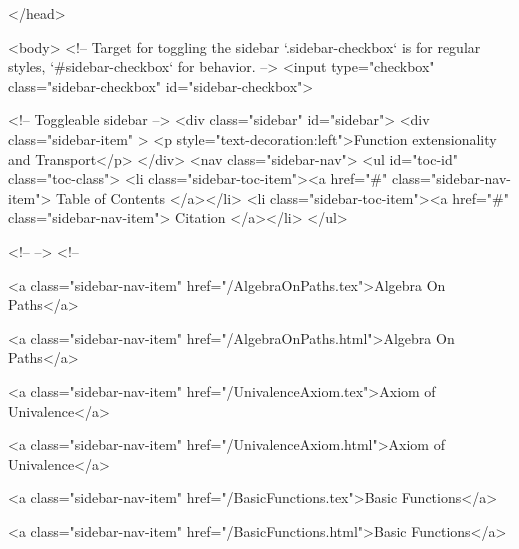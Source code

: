   
</head>




  <body>
    <!-- Target for toggling the sidebar `.sidebar-checkbox` is for regular
     styles, `#sidebar-checkbox` for behavior. -->
<input type="checkbox" class="sidebar-checkbox" id="sidebar-checkbox">

<!-- Toggleable sidebar -->
<div class="sidebar" id="sidebar">
  <div class="sidebar-item" >
    <p style="text-decoration:left">Function extensionality and Transport</p>
  </div>
  <nav class="sidebar-nav">
    <ul id="toc-id" class="toc-class">
  <li class="sidebar-toc-item"><a href="#" class="sidebar-nav-item"> Table of Contents </a></li>
  <li class="sidebar-toc-item"><a href="#" class="sidebar-nav-item"> Citation </a></li>
</ul>


    <!--  -->
    <!-- 
      
    
      
    
      
    
      
        
      
    
      
        
          <a class="sidebar-nav-item" href="/AlgebraOnPaths.tex">Algebra On Paths</a>
        
      
    
      
        
          <a class="sidebar-nav-item" href="/AlgebraOnPaths.html">Algebra On Paths</a>
        
      
    
      
        
          <a class="sidebar-nav-item" href="/UnivalenceAxiom.tex">Axiom of Univalence</a>
        
      
    
      
        
          <a class="sidebar-nav-item" href="/UnivalenceAxiom.html">Axiom of Univalence</a>
        
      
    
      
        
          <a class="sidebar-nav-item" href="/BasicFunctions.tex">Basic Functions</a>
        
      
    
      
        
          <a class="sidebar-nav-item" href="/BasicFunctions.html">Basic Functions</a>
        
      
    
      
        
